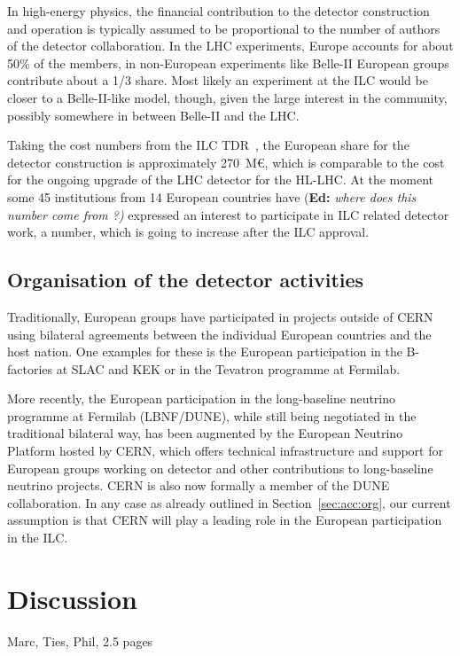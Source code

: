 \documentclass[%
 reprint,
 floatfix,
 amsmath,amssymb,
 aps,
]{revtex4-1}
\newif\ifEdNotes \EdNotestrue
\newcommand{\doednote}[1]{{\color{red}(\textbf{Ed:} \textit{#1)}}}
\newcommand{\ednote}[1]{\ifEdNotes 
  \doednote{#1} 
\fi}
\begin{document}
In high-energy physics, the financial contribution to the detector
construction and operation is typically assumed to be proportional to the number of authors of
the detector collaboration. In the LHC experiments, Europe accounts for about 50\% of the members, 
in non-European experiments like Belle-II European groups contribute about a 1/3 share. Most likely 
an experiment at the ILC would be closer to a Belle-II-like model, though, given the large interest 
in the community, possibly somewhere in between Belle-II and the LHC. 

Taking the cost numbers from the ILC TDR~\cite{Behnke:2013lya}, the European share for the detector construction 
is approximately 270~M\euro{}, which is comparable to the cost for the ongoing upgrade of the LHC detector for the HL-LHC. 
At the moment some 45 institutions from 14 European countries have \ednote{ where does this number come from ?} expressed 
an interest to participate in ILC related detector work, a number, which is going to increase after the ILC approval.

\subsection{\label{sec:det:Organisation} Organisation of the detector activities}
Traditionally, European groups have participated in projects outside of CERN using bilateral agreements between the individual 
European countries and the host nation. One examples for these is the European 
participation in the B-factories at SLAC and KEK or in the Tevatron programme at 
Fermilab.

More recently, the European participation in the long-baseline neutrino 
programme at Fermilab (LBNF/DUNE), while still being negotiated in the 
traditional bilateral way, has been augmented by the European Neutrino Platform 
hosted by CERN, which offers technical infrastructure and support for European 
groups working on detector and other contributions to long-baseline neutrino 
projects. CERN is also now formally a member of the DUNE collaboration.
In any case as already outlined in Section~\ref{sec:acc:org}, our current assumption is that 
CERN will play a leading role in the European participation in the ILC.

\section{\label{sec:discussion}Discussion}

Marc, Ties, Phil, 2.5 pages
\end{document}
